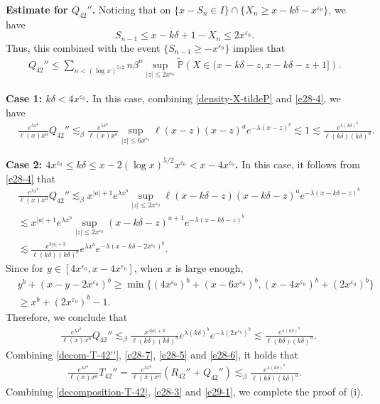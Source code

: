 \documentclass[11pt]{article}
\numberwithin{equation}{section}
\begin{document}
\noindent
{\bf Estimate for $Q_{42}''$.}
Noticing that on $\{x-S_n\in I\}\cap \{X_n\geq x-k\delta-x^{\varepsilon_0}\}$, we have 
\[
S_{n-1}\leq x-k\delta +1-X_n \leq 2x^{\varepsilon_0}.
\]
Thus, this combined with the event $\{S_{n-1}\geq -x^{\varepsilon_0}\}$ implies that 
\begin{align}\label{e28-4}
	Q_{42}'' \leq   \sum_{n< (\log x)^{5/2}}  n\beta^{n} \sup_{|z|\leq 2x^{\varepsilon_0}} \widetilde{\mathbb{P}}\left( X\in (x-k\delta-z, x-k\delta-z +1]\right).
\end{align}

\noindent
{\bf Case 1: $k\delta< 4x^{\varepsilon_0}$.}
In this case, combining \eqref{density-X-tildeP} and \eqref{e28-4}, we have 
\begin{align}\label{e28-5}
	& \frac{e^{\lambda x^b}}{\ell(x)x^a } Q_{42}''  \lesssim_\beta  \frac{e^{\lambda x^b}}{\ell(x)x^a }   \sup_{|z|\leq 6x^{\varepsilon_0}}  \ell(x-z)(x-z)^a e^{-\lambda (x-z)^b}  \lesssim 1 \lesssim \frac{e^{\lambda (k\delta)^b}}{\ell(k\delta)(k\delta)^a }.
\end{align}

\noindent
{\bf Case 2: $4x^{\varepsilon_0} \leq k\delta \leq x-2(\log x)^{5/2} x^{\varepsilon_0}<x-4x^{\varepsilon_0}$.}
In this case, it follows from \eqref{e28-4} that
\begin{align}
	&\frac{e^{\lambda x^b}}{\ell(x)x^a } Q_{42}''   \lesssim_\beta   x^{|a|+1} e^{\lambda x^b} \sup_{|z|\leq 2x^{\varepsilon_0}}  \ell(x-k\delta-z)(x-k\delta-z)^a e^{-\lambda (x-k\delta-z)^b}\nonumber\\
	&\lesssim x^{|a|+1} e^{\lambda x^b} \sup_{|z|\leq 2x^{\varepsilon_0}}   (x-k\delta-z)^{a+1} e^{-\lambda (x-k\delta-z)^b} \nonumber\\
	&\lesssim \frac{x^{3|a|+3} }{\ell(k\delta)(k\delta)^a}e^{\lambda x^b}  e^{-\lambda (x-k\delta-2x^{\varepsilon_0})^b}.
\end{align}
Since for $y\in[4x^{\varepsilon_0}, x-4x^{\varepsilon_0}]$, when $x$ is large enough,
\begin{align}
	 & y^b+ (x-y-2x^{\varepsilon_0})^b  \geq \min\{ (4x^{\varepsilon_0})^b+ (x-6x^{\varepsilon_0})^b, (x-4x^{\varepsilon_0})^b+ (2x^{\varepsilon_0})^b\} \nonumber\\
	& \geq x^b +(2x^{\varepsilon_0})^b-1.
\end{align}
Therefore, we conclude that 
\begin{align}\label{e28-6}
	& \frac{e^{\lambda x^b}}{\ell(x)x^a } Q_{42}''  \lesssim_\beta  \frac{x^{3|a|+3} }{\ell(k\delta)(k\delta)^a}e^{\lambda (k\delta)^b}  e^{-\lambda ( 2x^{\varepsilon_0})^b}\lesssim \frac{e^{\lambda (k\delta)^b}}{\ell(k\delta)(k\delta)^a }.
\end{align}
Combining \eqref{decom-T-42''}, \eqref{e28-7}, \eqref{e28-5} and \eqref{e28-6}, it holds that 
\begin{align}\label{e29-1}
	\frac{e^{\lambda x^b}}{\ell(x)x^a } T_{42}''   = \frac{e^{\lambda x^b}}{\ell(x)x^a } (R_{42}''+Q_{42}'')  \lesssim_\beta  \frac{e^{\lambda (k\delta)^b}}{\ell(k\delta)(k\delta)^a }.
\end{align}
Combining  \eqref{decomposition-T-42},  \eqref{e28-3} and \eqref{e29-1}, we complete the proof of (i). 
\end{document}
